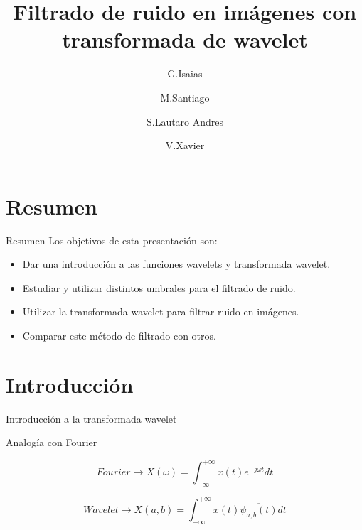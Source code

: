 \documentclass{beamer}
\title{Filtrado de ruido en imágenes con transformada de wavelet}
\author{
  G.Isaias \and   
  M.Santiago \and 
  S.Lautaro Andres \and
  V.Xavier 
}
\institute{
  Universidad Nacional del Comahue \\ 
  Buenos Aires 14000, Neuquen \\ 
}
\date{}
\begin{document}
    
  \begin{frame}
    \titlepage  
  \end{frame}

  \begin{frame}
    \tableofcontents
  
    
  
  \end{frame}

  \section{Resumen}
\begin{frame}
\begin{block}{Resumen}
Los objetivos de esta presentación son:
\begin{itemize}
\item Dar una introducción a las funciones wavelets y transformada wavelet.
\item Estudiar y utilizar distintos umbrales para el filtrado de ruido.
\item Utilizar la transformada wavelet para filtrar ruido en imágenes.
\item Comparar este método de filtrado con otros.
\end{itemize}
\end{block}
\end{frame}

\section{Introducción}
\begin{frame}{Introducción a la transformada wavelet}
\begin{block}{Analogía con Fourier}

\begin{equation}
Fourier \rightarrow X(\omega) = \int_{-\infty}^{+\infty} x(t) e^{-j \omega t} dt
\end{equation}

\begin{equation}
 Wavelet \rightarrow X(a,b) = \int_{-\infty}^{+\infty} x(t) \overline{\psi_{a,b} (t)} dt
\end{equation}

\end{block}
\end{frame}
\end{document}
